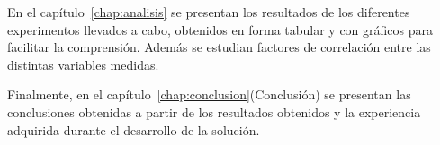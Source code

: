 
En el capítulo~\ref{chap:analisis} se presentan los resultados de los diferentes
experimentos llevados a cabo, obtenidos en forma tabular y con gráficos para
facilitar la comprensión. Además se estudian factores de correlación entre las
distintas variables medidas.


Finalmente, en el capítulo~\ref{chap:conclusion}(Conclusión) se presentan las
conclusiones obtenidas a partir de los resultados obtenidos y la experiencia
adquirida durante el desarrollo de la solución.

